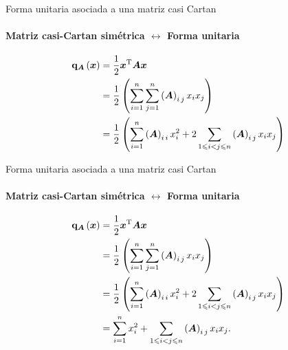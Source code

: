 \documentclass[spanish]{beamer}
\begin{document}
\begin{frame}{Forma unitaria asociada a una matriz casi Cartan}
  \framesubtitle{Matriz casi-Cartan simétrica $\leftrightarrow$ Forma unitaria}
  \begin{align*}
    \Quadratic{\mat{A}}\left(\vec{x}\right) &= \frac{1}{2} 
    \transpose{\vec{x}} \mat{A} \vec{x}  \\
    &= \frac{1}{2} \left( \sum_{i = 1}^{n} \sum_{j = 1}^{n} 
      \entry{\mat{A}}{i}{j} x_i x_j \right)  \\
    &= \frac{1}{2} \left(\sum_{i=1}^{n} \entry{\mat{A}}{i}{i} x_i^2
       + 2 \sum_{1 \le i < j \le n} \entry{\mat{A}}{i}{j} x_i x_j\right)  
  \end{align*}
\end{frame}

\begin{frame}{Forma unitaria asociada a una matriz casi Cartan}
  \framesubtitle{Matriz casi-Cartan simétrica $\leftrightarrow$ Forma unitaria}
  \begin{align*}
    \Quadratic{\mat{A}}\left(\vec{x}\right) &= \frac{1}{2} 
    \transpose{\vec{x}} \mat{A} \vec{x}  \\
    &= \frac{1}{2} \left( \sum_{i = 1}^{n} \sum_{j = 1}^{n} 
      \entry{\mat{A}}{i}{j} x_i x_j \right)  \\
    &= \frac{1}{2} \left(\sum_{i=1}^{n} \entry{\mat{A}}{i}{i} x_i^2
       + 2 \sum_{1 \le i < j \le n} \entry{\mat{A}}{i}{j} x_i x_j\right)  
       \\
    &= \sum_{i=1}^{n} x_i^2 + \sum_{1 \le i < j \le n} \entry{\mat{A}}{i}{j}    
       x_i x_j \text{.}
  \end{align*}
\end{frame}

\end{document}
